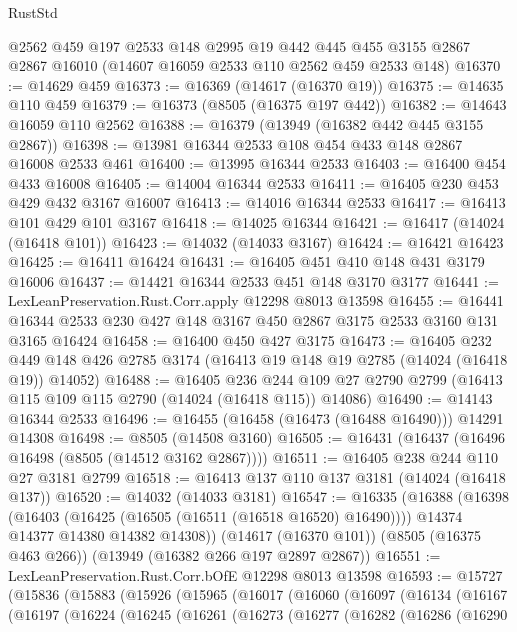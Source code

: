 \begin{lexlean}{RustStd}
\begin{coremodule}
    @2562
    @459
    @197
    @2533
    @148
    @2995
    @19
    @442
    @445
    @455
    @3155
    @2867
    @2867
    @16010
    (@14607 @16059 @2533 @110 @2562 @459 @2533 @148)
@16370 := @14629 @459
@16373 := @16369 (@14617 (@16370 @19))
@16375 := @14635 @110 @459
@16379 := @16373 (@8505 (@16375 @197 @442))
@16382 := @14643 @16059 @110 @2562
@16388 := @16379 (@13949 (@16382 @442 @445 @3155 @2867))
@16398 := @13981 @16344 @2533 @108 @454 @433 @148 @2867 @16008 @2533 @461
@16400 := @13995 @16344 @2533
@16403 := @16400 @454 @433 @16008
@16405 := @14004 @16344 @2533
@16411 := @16405 @230 @453 @429 @432 @3167 @16007
@16413 := @14016 @16344 @2533
@16417 := @16413 @101 @429 @101 @3167
@16418 := @14025 @16344
@16421 := @16417 (@14024 (@16418 @101))
@16423 := @14032 (@14033 @3167)
@16424 := @16421 @16423
@16425 := @16411 @16424
@16431 := @16405 @451 @410 @148 @431 @3179 @16006
@16437 := @14421 @16344 @2533 @451 @148 @3170 @3177
@16441 := LexLeanPreservation.Rust.Corr.apply @12298 @8013 @13598
@16455 := @16441 @16344 @2533 @230 @427 @148 @3167 @450 @2867 @3175 @2533 @3160 @131 @3165 @16424
@16458 := @16400 @450 @427 @3175
@16473 := @16405
    @232
    @449
    @148
    @426
    @2785
    @3174
    (@16413 @19 @148 @19 @2785 (@14024 (@16418 @19)) @14052)
@16488 := @16405
    @236
    @244
    @109
    @27
    @2790
    @2799
    (@16413 @115 @109 @115 @2790 (@14024 (@16418 @115)) @14086)
@16490 := @14143 @16344 @2533
@16496 := @16455 (@16458 (@16473 (@16488 @16490))) @14291 @14308
@16498 := @8505 (@14508 @3160)
@16505 := @16431 (@16437 (@16496 @16498 (@8505 (@14512 @3162 @2867))))
@16511 := @16405 @238 @244 @110 @27 @3181 @2799
@16518 := @16413 @137 @110 @137 @3181 (@14024 (@16418 @137))
@16520 := @14032 (@14033 @3181)
@16547 := @16335
    (@16388
      (@16398
        (@16403 (@16425 (@16505 (@16511 (@16518 @16520) @16490))))
        @14374
        @14377
        @14380
        @14382
        @14308))
    (@14617 (@16370 @101))
    (@8505 (@16375 @463 @266))
    (@13949 (@16382 @266 @197 @2897 @2867))
@16551 := LexLeanPreservation.Rust.Corr.bOfE @12298 @8013 @13598
@16593 := @15727
    (@15836
      (@15883
        (@15926
          (@15965
            (@16017
              (@16060
                (@16097
                  (@16134
                    (@16167
                      (@16197
                        (@16224
                          (@16245
                            (@16261
                              (@16273
                                (@16277
                                  (@16282
                                    (@16286
                                      (@16290

\end{coremodule}
\end{lexlean}
